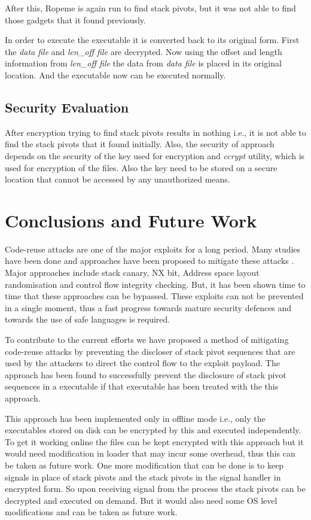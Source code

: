 \documentclass{article}
\begin{document}
\begin{multicols}{2}
	After this, Ropeme\cite{ropeme} is again run to find stack pivots, but it was not able to find those gadgets that it found previously.
	
	In order to execute the executable it is converted back to its original form. First the \textit{data file} and \textit{len\_off file} are decrypted. Now using the offset and length information from \textit{len\_off file} the data from \textit{data file} is placed in its original location. And the executable now can be executed normally.
	
	\subsection{Security Evaluation}
	After encryption trying to find stack pivots results in nothing i.e., it is not able to find the stack pivots that it found initially. Also, the security of approach depends on the security of the key used for encryption and \textit{ccrypt} utility, which is used for encryption of the files. Also the key need to be stored on a secure location that cannot be accessed by any unauthorized means.

	\section{Conclusions and Future Work}
	Code-reuse attacks are one of the major exploits for a long period. Many studies have been done and approaches have been proposed to mitigate these attacks \cite{secrvw}\cite{memerr}\cite{marlin}. Major approaches include stack canary, NX bit, Address space layout randomisation and control flow integrity checking. But, it has been shown time to time that these approaches can be bypassed. These exploits can not be prevented in a single moment, thus a fast progress towards mature security defences and towards the use of safe languages is required.
	
	To contribute to the current efforts we have proposed a method of mitigating code-reuse attacks by preventing the discloser of stack pivot sequences that are used by the attackers to direct the control flow to the exploit payload. The approach has been found to successfully prevent the disclosure of stack pivot sequences in a executable if that executable has been treated with the this approach.
	
	This approach has been implemented only in offline mode i.e., only the executables stored on disk can be encrypted by this and executed independently. To get it working online the files can be kept encrypted with this approach but it would need modification in loader that may incur some overhead, thus this can be taken as future work. One more modification that can be done is to keep signals in place of stack pivots and the stack pivots in the signal handler in encrypted form. So upon receiving signal from the process the stack pivots can be decrypted and executed on demand. But it would also need some OS level modifications and can be taken as future work.
	
    
    
	
	\end{multicols}
\end{document}
